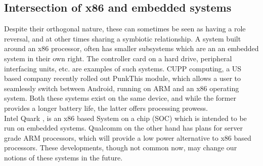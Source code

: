 \documentclass[seminar,twoside]{iitbreport}
\begin{document}
\subsection{Intersection of x86 and embedded systems}
Despite their orthogonal nature, these can sometimes be seen as having a role reversal, and at other times sharing a symbiotic relationship.
A system built around an x86 processor, often has smaller subsystems which are an an embedded system in their own right. The controller card on a hard drive, peripheral interfacing units,
etc. are examples of such systems. CUPP computing, a US based company recently rolled out PunkThis module, which allows a user to seamlessly switch between Android, running on ARM
and an x86 operating system. Both these systems exist on the same device, and while the former provides a longer battery life, the latter offers processing prowess.
\\
Intel Quark , is an x86 based System on a chip (SOC) which is intended to be run on embedded systems. Qualcomm on the other hand has plans for server grade ARM processors, which
will provide a low power alternative to x86 based processors. These developments, though not common now, may change our notions of these systems in the future.
\newpage
\end{document}
